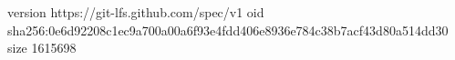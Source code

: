 version https://git-lfs.github.com/spec/v1
oid sha256:0e6d92208c1ec9a700a00a6f93e4fdd406e8936e784c38b7acf43d80a514dd30
size 1615698

